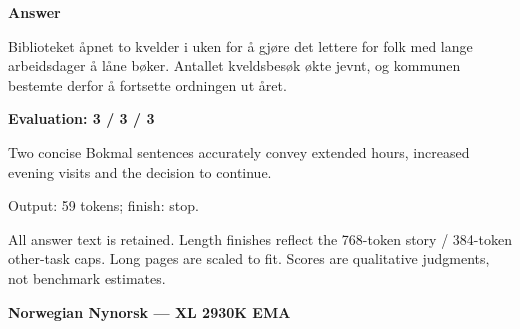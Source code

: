 \documentclass[10pt]{article}
\begin{document}
{\begin{minipage}{\textwidth}
\textbf{Answer}\par Biblioteket åpnet to kvelder i uken for å gjøre det lettere for folk med lange arbeidsdager å låne bøker. Antallet kveldsbesøk økte jevnt, og kommunen bestemte derfor å fortsette ordningen ut året.\par\smallskip
\textbf{Evaluation: 3 / 3 / 3}\par Two concise Bokmal sentences accurately convey extended hours, increased evening visits and the decision to continue.
\par {\color{gray} Output: 59 tokens; finish: stop.}\par
\medskip\footnotesize All answer text is retained. Length finishes reflect the 768-token story / 384-token other-task caps. Long pages are scaled to fit. Scores are qualitative judgments, not benchmark estimates.
\end{minipage}}%
\noindent\ifdim\dimexpr\ht\languagepage+\dp\languagepage\relax>0.93\textheight%
\resizebox*{!}{0.93\textheight}{\usebox{\languagepage}}%
\else\usebox{\languagepage}\fi%
\clearpage
{\Large\bfseries Norwegian Nynorsk --- XL 2930K EMA}\par\smallskip
\end{document}
